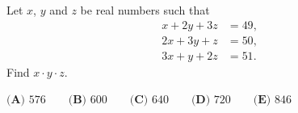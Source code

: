 Let $x$, $y$ and $z$ be real numbers such that
\begin{align*}
x+2y+3z&=49,\\
2x+3y+z&=50,\\
3x+y+2z&=51.
\end{align*}
Find $x\cdot y\cdot z$.

$\textbf{(A) }576\qquad\textbf{(B) }600\qquad\textbf{(C) }640\qquad\textbf{(D) }720\qquad\textbf{(E) }846$
